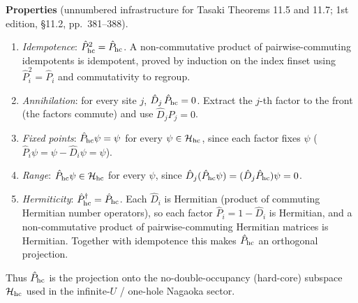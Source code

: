 \documentclass[a4paper,11pt]{article}
\begin{document}
\medskip
\noindent\textbf{Properties} (unnumbered infrastructure for Tasaki
Theorems 11.5 and 11.7; 1st edition, §11.2, pp.~381--388).
\begin{enumerate}
  \item \emph{Idempotence}: \(\hat P_{\rm hc}^2 = \hat P_{\rm hc}\).
    A non-commutative product of pairwise-commuting idempotents is
    idempotent, proved by induction on the index finset using
    \(\hat P_i^2=\hat P_i\) and commutativity to regroup.
  \item \emph{Annihilation}: for every site \(j\),
    \(\hat D_j\,\hat P_{\rm hc} = 0\). Extract the \(j\)-th factor to the
    front (the factors commute) and use \(\hat D_j\hat P_j = 0\).
  \item \emph{Fixed points}: \(\hat P_{\rm hc}\psi = \psi\) for every
    \(\psi\in\mathcal H_{\rm hc}\), since each factor fixes \(\psi\)
    (\(\hat P_i\psi = \psi - \hat D_i\psi = \psi\)).
  \item \emph{Range}: \(\hat P_{\rm hc}\psi\in\mathcal H_{\rm hc}\) for
    every \(\psi\), since
    \(\hat D_j(\hat P_{\rm hc}\psi) = (\hat D_j\hat P_{\rm hc})\psi = 0\).
  \item \emph{Hermiticity}: \(\hat P_{\rm hc}^\dagger = \hat P_{\rm hc}\).
    Each \(\hat D_i\) is Hermitian (product of commuting Hermitian number
    operators), so each factor \(\hat P_i = 1 - \hat D_i\) is Hermitian, and
    a non-commutative product of pairwise-commuting Hermitian matrices is
    Hermitian. Together with idempotence this makes \(\hat P_{\rm hc}\) an
    orthogonal projection.
\end{enumerate}
Thus \(\hat P_{\rm hc}\) is the projection onto the no-double-occupancy
(hard-core) subspace \(\mathcal H_{\rm hc}\) used in the infinite-\(U\) /
one-hole Nagaoka sector.
\end{document}

